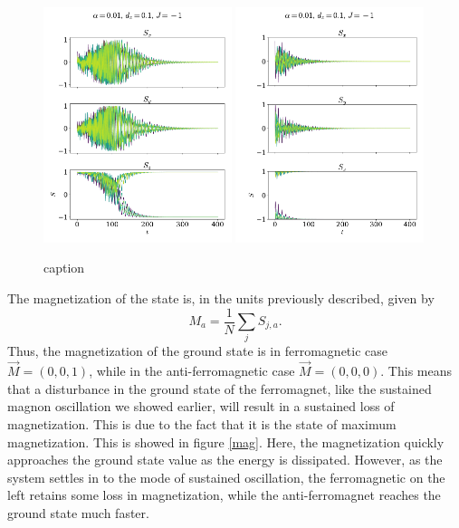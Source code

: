 \documentclass{article}
\begin{document}
    \begin{figure}
        \centering
        \includegraphics[width=0.49\textwidth]{../plots/2225.pdf}
        \includegraphics[width=0.49\textwidth]{../plots/22252.pdf}
        \caption{caption}
        \label{one tilted dampend af}
    \end{figure}

    The magnetization of the state is, in the units previously described, given by
    \begin{equation*}
        M_a = \frac{1}{N} \sum_j S_{j, a}.
    \end{equation*}
    Thus, the magnetization of the ground state is in ferromagnetic case $\vec M = (0, 0, 1)$, while in the anti-ferromagnetic case $\vec M = (0, 0, 0)$. This means that a disturbance in the ground state of the ferromagnet, like the sustained magnon oscillation we showed earlier, will result in a sustained loss of magnetization. This is due to the fact that it is the state of maximum magnetization. This is showed in figure \ref{mag}. Here, the magnetization quickly approaches the ground state value as the energy is dissipated. However, as the system settles in to the mode of sustained oscillation, the ferromagnetic on the left retains some loss in magnetization, while the anti-ferromagnet reaches the ground state much faster.
\end{document}
